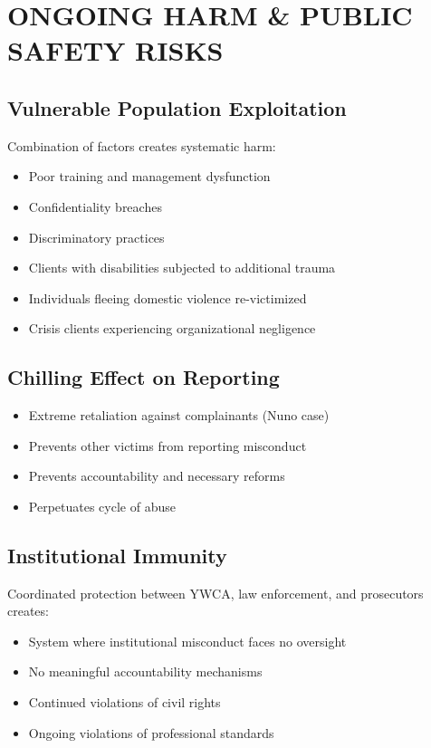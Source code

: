 \documentclass[12pt,oneside]{article}
\begin{document}
\section*{ONGOING HARM \& PUBLIC SAFETY RISKS}

\subsection*{Vulnerable Population Exploitation}

Combination of factors creates systematic harm:
\begin{itemize}
\item Poor training and management dysfunction
\item Confidentiality breaches
\item Discriminatory practices
\item Clients with disabilities subjected to additional trauma
\item Individuals fleeing domestic violence re-victimized
\item Crisis clients experiencing organizational negligence
\end{itemize}

\subsection*{Chilling Effect on Reporting}

\begin{itemize}
\item Extreme retaliation against complainants (Nuno case)
\item Prevents other victims from reporting misconduct
\item Prevents accountability and necessary reforms
\item Perpetuates cycle of abuse
\end{itemize}

\subsection*{Institutional Immunity}

Coordinated protection between YWCA, law enforcement, and prosecutors creates:
\begin{itemize}
\item System where institutional misconduct faces no oversight
\item No meaningful accountability mechanisms
\item Continued violations of civil rights
\item Ongoing violations of professional standards
\end{itemize}
\end{document}
